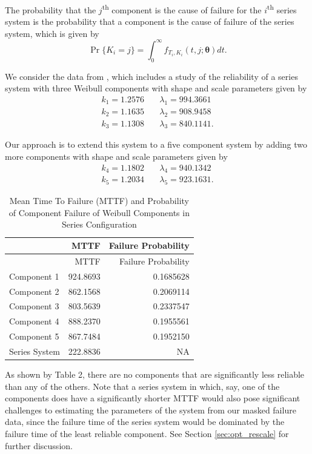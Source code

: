\documentclass[
]{article}
\begin{document}
The probability that the \(j\)\textsuperscript{th} component is the
cause of failure for the \(i\)\textsuperscript{th} series system is the
probability that a component is the cause of failure of the series
system, which is given by \[
\Pr\{K_i = j\} = \int_{0}^\infty f_{T_i, K_i}(t, j ; \boldsymbol{\theta}) dt.
\]

We consider the data from \citet{Huairu-2013}, which includes a study of
the reliability of a series system with three Weibull components with
shape and scale parameters given by \begin{equation}
\begin{aligned}
    k_1 = 1.2576 &\quad \lambda_1 = 994.3661\\
    k_2 = 1.1635 &\quad \lambda_2 = 908.9458\\
    k_3 = 1.1308 &\quad \lambda_3 = 840.1141.
\end{aligned}
\end{equation}

Our approach is to extend this system to a five component system by
adding two more components with shape and scale parameters given by
\begin{equation}
\begin{aligned}
    k_4 = 1.1802 &\quad \lambda_4 = 940.1342\\
    k_5 = 1.2034 &\quad \lambda_5 = 923.1631.
\end{aligned}
\end{equation}

\begin{longtable}[]{@{}lrr@{}}
\caption{Mean Time To Failure (MTTF) and Probability of Component
Failure of Weibull Components in Series Configuration}\tabularnewline
\toprule
& MTTF & Failure Probability\tabularnewline
\midrule
\endfirsthead
\toprule
& MTTF & Failure Probability\tabularnewline
\midrule
\endhead
Component 1 & 924.8693 & 0.1685628\tabularnewline
Component 2 & 862.1568 & 0.2069114\tabularnewline
Component 3 & 803.5639 & 0.2337547\tabularnewline
Component 4 & 888.2370 & 0.1955561\tabularnewline
Component 5 & 867.7484 & 0.1952150\tabularnewline
Series System & 222.8836 & NA\tabularnewline
\bottomrule
\end{longtable}

As shown by Table 2, there are no components that are significantly less
reliable than any of the others. Note that a series system in which,
say, one of the components does have a significantly shorter MTTF would
also pose significant challenges to estimating the parameters of the
system from our masked failure data, since the failure time of the
series system would be dominated by the failure time of the least
reliable component. See Section \ref{sec:opt_rescale} for further
discussion.
\end{document}
